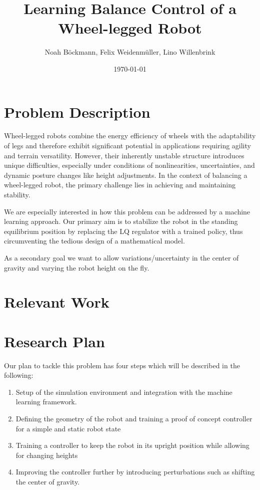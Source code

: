 \documentclass[a4paper]{article}
\title{Learning Balance Control of a Wheel-legged Robot}
\author{Noah Böckmann, Felix Weidenmüller, Lino Willenbrink}
\date{\today}
\begin{document}
\maketitle
\section{Problem Description}
Wheel-legged robots combine the energy efficiency of wheels with the adaptability of legs and
therefore exhibit significant potential in applications requiring agility and terrain versatility.
However, their inherently unstable structure introduces unique difficulties, especially under
conditions of nonlinearities, uncertainties, and dynamic posture changes like height adjustments.
In the context of balancing a wheel-legged robot, the primary challenge lies in achieving and
maintaining stability.

We are especially interested in how this problem can be addressed by a machine learning approach.
Our primary aim is to stabilize the robot in the standing equilibrium position by replacing the LQ
regulator with a trained policy, thus circumventing the tedious design of a mathematical model.

As a secondary goal we want to allow variations/uncertainty in the center of gravity and varying the
robot height on the fly.

\section{Relevant Work}

\section{Research Plan}
Our plan to tackle this problem has four steps which will be described in the following:
\begin{enumerate}
  \item Setup of the simulation environment and integration with the machine learning framework.
  \item Defining the geometry of the robot and training a proof of concept controller for a simple
        and static robot state
  \item Training a controller to keep the robot in its upright position while allowing for changing heights
  \item Improving the controller further by introducing perturbations such as shifting the center of
        gravity.
\end{enumerate}
\end{document}
